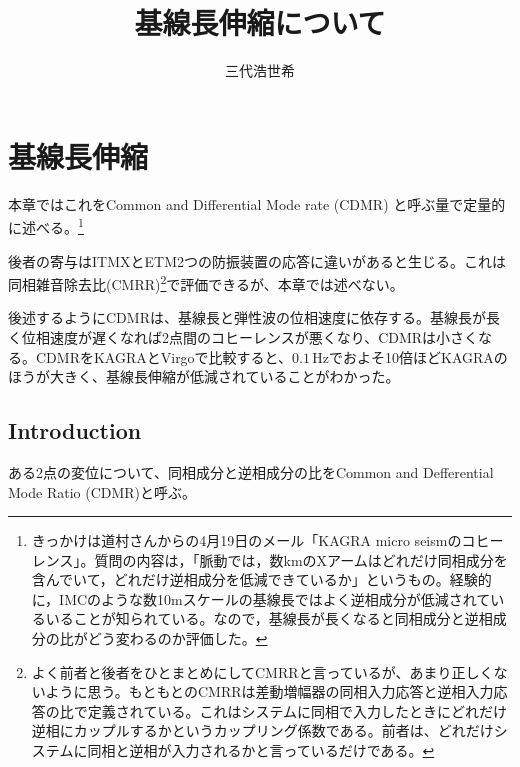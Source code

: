 \documentclass[a4paper,12pt]{jsarticle}
\title{基線長伸縮について}
\author{三代浩世希}
\begin{document}
\setcounter{tocdepth}{2}
\maketitle
{}
\tableofcontents

\section{基線長伸縮}

本章ではこれをCommon and Differential Mode rate (CDMR) と呼ぶ量で定量的に述べる。\footnote[2]{きっかけは道村さんからの4月19日のメール「KAGRA micro seismのコヒーレンス」。質問の内容は，「脈動では，数kmのXアームはどれだけ同相成分を含んでいて，どれだけ逆相成分を低減できているか」というもの。経験的に，IMCのような数10mスケールの基線長ではよく逆相成分が低減されているいることが知られている。なので，基線長が長くなると同相成分と逆相成分の比がどう変わるのか評価した。}

後者の寄与はITMXとETM2つの防振装置の応答に違いがあると生じる。これは同相雑音除去比(CMRR)\footnote[3]{よく前者と後者をひとまとめにしてCMRRと言っているが、あまり正しくないように思う。もともとのCMRRは差動増幅器の同相入力応答と逆相入力応答の比で定義されている。これはシステムに同相で入力したときにどれだけ逆相にカップルするかというカップリング係数である。前者は、どれだけシステムに同相と逆相が入力されるかと言っているだけである。}で評価できるが、本章では述べない。

後述するようにCDMRは、基線長と弾性波の位相速度に依存する。基線長が長く位相速度が遅くなれば2点間のコヒーレンスが悪くなり、CDMRは小さくなる。CDMRをKAGRAとVirgoで比較すると、$0.1\, \mathrm{Hz}$でおよそ10倍ほどKAGRAのほうが大きく、基線長伸縮が低減されていることがわかった。

\subsection{Introduction}
 ある2点の変位について、同相成分と逆相成分の比をCommon and Defferential Mode Ratio (CDMR)と呼ぶ。
\end{document}
